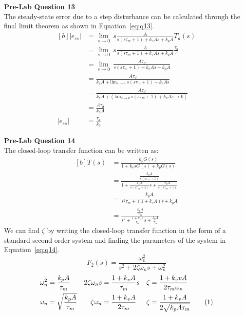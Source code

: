 \documentclass[12pt]{article}
\begin{document}
\textbf{Pre-Lab Question 13} \\
The steady-state error due to a step disturbance can be calculated through the final limit theorem as shown in Equation~\ref{eq:q13}.
\begin{equation} \label{eq:q13}
\begin{aligned}[b]
    \left|e_{ss}\right| &= \lim_{s \to 0} \ s\frac{A}{s(s\tau_m+1) + k_vAs + k_pA}T_d(s) \\
    &= \lim_{s \to 0} \ s\frac{A}{s(s\tau_m+1) + k_vAs + k_pA}\frac{\tau_d}{s} \\
    &= \lim_{s \to 0} \ \frac{A\tau_d}{s(s\tau_m+1) + k_vAs + k_pA} \\
    &= \frac{A\tau_d}{k_pA + \text{lim}_{s \to 0} \ s(s\tau_m+1) + k_vAs} \\
    &= \frac{A\tau_d}{k_pA + (\text{lim}_{s \to 0} \ s(s\tau_m+1) + k_vAs \to 0)} \\
    &= \frac{A\tau_d}{k_pA} \\
    \left|e_{ss}\right|&= \frac{\tau_d}{k_p}
\end{aligned}
\end{equation} 

\textbf{Pre-Lab Question 14} \\
The closed-loop transfer function can be written as:
\begin{equation*}
\begin{aligned}[b]
    T(s) &= \frac{k_pG(s)}{1 + k_vsG(s) + k_pG(s)} \\
    &= \frac{\frac{k_pA}{s(s\tau_m + 1)}}{1 + \frac{k_vA}{s(s\tau_m + 1)}s + \frac{k_pA}{s(s\tau_m + 1)}} \\
    &= \frac{k_pA}{s^2\tau_m + (1 + k_vA)s + k_pA} \\
    &= \frac{\frac{k_pA}{\tau_m}}{s^2 + \frac{1 + k_vA}{\tau_m}s + \frac{k_pA}{\tau_m}} 
\end{aligned}
\end{equation*}
We can find $\zeta$ by writing the closed-loop transfer function in the form of a standard second order system and finding the parameters of the system in Equation~\ref{eq:q14}.
\begin{equation*}
    F_2(s) = \frac{\omega_n^2}{s^2 + 2\zeta\omega_ns + \omega_n^2}
\end{equation*}
\begin{align*}
    \omega_n^2 &= \frac{k_pA}{\tau_m} & 2\zeta\omega_ns &= \frac{1+k_vA}{\tau_m}s & \zeta &= \frac{1+k_vvA}{2\tau_m\omega_n} \\
    \omega_n &= \sqrt{\frac{k_pA}{\tau_m}} & \zeta\omega_n &= \frac{1+k_vA}{2\tau_m} & \zeta &= \frac{1+k_vA}{2\sqrt{k_pA\tau_m}} \stepcounter{equation}\tag{\theequation}\label{eq:q14}
\end{align*}
\end{document}
